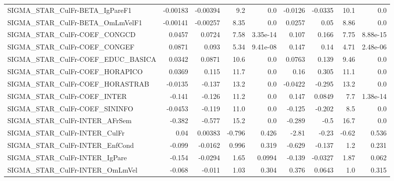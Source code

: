 \begin{tabular}{lrrrrrrrr}
SIGMA\_STAR\_CulFr-BETA\_IgPareF1        &    -0.00183 &     -0.00394 &     9.2 &      0.0 &    -0.0126 &     -0.0335 &         10.1 &           0.0 \\
SIGMA\_STAR\_CulFr-BETA\_OmLmVelF1       &    -0.00141 &     -0.00257 &    8.35 &      0.0 &     0.0257 &        0.05 &         8.86 &           0.0 \\
SIGMA\_STAR\_CulFr-COEF\_CONGCD          &      0.0457 &       0.0724 &    7.58 & 3.35e-14 &      0.107 &       0.166 &         7.75 &      8.88e-15 \\
SIGMA\_STAR\_CulFr-COEF\_CONGEF          &      0.0871 &        0.093 &    5.34 & 9.41e-08 &      0.147 &        0.14 &         4.71 &      2.48e-06 \\
SIGMA\_STAR\_CulFr-COEF\_EDUC\_BASICA     &      0.0342 &       0.0871 &    10.6 &      0.0 &     0.0763 &       0.139 &         9.46 &           0.0 \\
SIGMA\_STAR\_CulFr-COEF\_HORAPICO        &      0.0369 &        0.115 &    11.7 &      0.0 &       0.16 &       0.305 &         11.1 &           0.0 \\
SIGMA\_STAR\_CulFr-COEF\_HORASTRAB       &     -0.0135 &       -0.137 &    13.2 &      0.0 &    -0.0422 &      -0.295 &         13.2 &           0.0 \\
SIGMA\_STAR\_CulFr-COEF\_INTER           &      -0.141 &       -0.126 &    11.2 &      0.0 &      0.147 &      0.0849 &          7.7 &      1.38e-14 \\
SIGMA\_STAR\_CulFr-COEF\_SININFO         &     -0.0453 &       -0.119 &    11.0 &      0.0 &     -0.125 &      -0.202 &          8.5 &           0.0 \\
SIGMA\_STAR\_CulFr-INTER\_AFrSem         &      -0.382 &       -0.577 &    15.2 &      0.0 &     -0.289 &        -0.5 &         16.7 &           0.0 \\
SIGMA\_STAR\_CulFr-INTER\_CulFr          &        0.04 &      0.00383 &  -0.796 &    0.426 &      -2.81 &       -0.23 &        -0.62 &         0.536 \\
SIGMA\_STAR\_CulFr-INTER\_EnfCond        &      -0.099 &      -0.0162 &   0.996 &    0.319 &     -0.629 &      -0.137 &          1.2 &         0.231 \\
SIGMA\_STAR\_CulFr-INTER\_IgPare         &      -0.154 &      -0.0294 &    1.65 &   0.0994 &     -0.139 &     -0.0327 &         1.87 &         0.062 \\
SIGMA\_STAR\_CulFr-INTER\_OmLmVel        &      -0.068 &       -0.011 &    1.03 &    0.304 &      0.376 &      0.0643 &          1.0 &         0.315 \\

\end{tabular}
